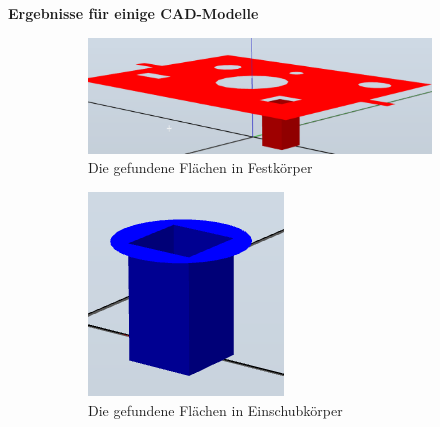 \documentclass[14pt,a4paper,titlepage]{article}
\begin{document}
		\textbf{Ergebnisse für einige CAD-Modelle}
			\begin{figure}[b!]
				\centering
				\begin{subfigure}{0.3\linewidth}
					\includegraphics[width=\linewidth]{basefaces1.png}
					\caption{Die gefundene Flächen in Festkörper}
				\end{subfigure}
				\begin{subfigure}{0.3\linewidth}
					\includegraphics[width=\linewidth]{insertfaces1.png}
					\caption{Die gefundene Flächen in Einschubkörper}
				\end{subfigure}	
				\begin{subfigure}{0.3\linewidth}

\end{subfigure}
\end{figure}
\end{document}
